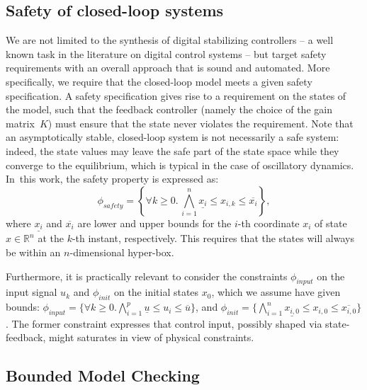 \documentclass[twocolumn]{autart}    %
\newcommand{\addtodo}[1]{\textcolor{red}{[#1]}}
\begin{document}
\subsection{Safety of closed-loop systems}
\label{sec:safety}

We are not limited to the synthesis of digital stabilizing controllers -- a
well known task in the literature on digital control systems -- but target
safety requirements with an overall approach that is sound and automated. 
More specifically, we require that the closed-loop model 
meets a given safety specification.  
A safety specification gives rise to a requirement on the states of the model, such
that the feedback controller (namely the choice of the gain matrix~$K$)
must ensure that the state never violates the requirement.  Note that an asymptotically 
stable, closed-loop system is not necessarily a safe system: indeed, the 
state values may leave the safe part of the state space while they converge
to the equilibrium, which is typical in the case of oscillatory dynamics. 
In~this work, the safety property is expressed as: 
%
\begin{equation}
\label{eq:safetyliteral}
\phi_\mathit{safety} = \left\{ \forall k\ge 0.\, \bigwedge_{i=1}^{n}{\underline{x_{i}} \leq x_{i,k} \leq \overline{x_{i}}}\right\},
\end{equation}
%
%
where $\underline{x_{i}}$ and $\overline{x_{i}}$ are lower and upper bounds
for the $i$-th coordinate $x_{i}$ of state $x\in \mathbb R^n$ 
at the $k$-th instant, respectively.  This requires that the states will always be within an $n$-dimensional hyper-box.

Furthermore, it is practically relevant to consider the 
constraints $\phi_\mathit{input}$ on the input
signal $u_{k}$ and $\phi_\mathit{init}$ on the initial states $x_0$,
which we assume have given bounds:
$\phi_\mathit{input} = \{\forall k \geq 0.\bigwedge_{i=1}^{p} \underline{u} \leq u_{i} \leq \overline{u}\} $,
and $\phi_\mathit{init} = \{ \bigwedge_{i=1}^{n} \underline{x_{i,0}} \leq x_{i,0} \leq \overline{x_{i,0}}\}$. 
The former constraint expresses that control input, possibly shaped via state-feedback, 
might saturates in view of physical constraints.


\subsection{Bounded Model Checking}
\label{sec:BMC}
\end{document}

